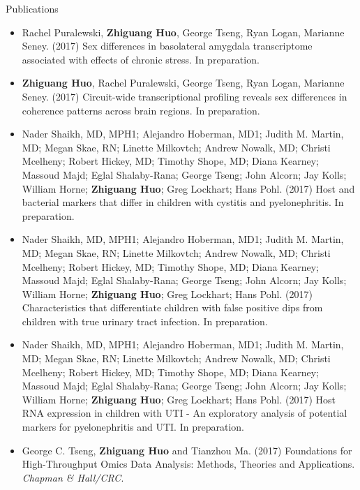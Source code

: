 \documentclass{resume} %
\begin{document}
\begin{rSection}{Publications}
\begin{itemize}
\item Rachel Puralewski, {\bf Zhiguang Huo}, George Tseng, Ryan Logan, Marianne Seney. (2017) Sex differences in basolateral amygdala transcriptome associated with effects of chronic stress. In preparation.

\item {\bf Zhiguang Huo}, Rachel Puralewski, George Tseng, Ryan Logan, Marianne Seney. (2017) Circuit-wide transcriptional profiling reveals sex differences in coherence patterns across brain regions. In preparation.

\item Nader Shaikh, MD, MPH1; Alejandro Hoberman, MD1; Judith M. Martin, MD; Megan Skae, RN; Linette Milkovtch; Andrew Nowalk, MD; Christi Mcelheny; Robert Hickey, MD; Timothy Shope, MD; Diana Kearney; Massoud Majd; Eglal Shalaby-Rana; George Tseng; John Alcorn; Jay Kolls; William Horne; {\bf Zhiguang Huo}; Greg Lockhart; Hans Pohl. (2017) Host and bacterial markers that differ in children with cystitis and pyelonephritis. In preparation.

\item Nader Shaikh, MD, MPH1; Alejandro Hoberman, MD1; Judith M. Martin, MD; Megan Skae, RN; Linette Milkovtch; Andrew Nowalk, MD; Christi Mcelheny; Robert Hickey, MD; Timothy Shope, MD; Diana Kearney; Massoud Majd; Eglal Shalaby-Rana; George Tseng; John Alcorn; Jay Kolls; William Horne; {\bf Zhiguang Huo}; Greg Lockhart; Hans Pohl. (2017) Characteristics that differentiate children with false positive dips from children with true urinary tract infection. In preparation.

\item Nader Shaikh, MD, MPH1; Alejandro Hoberman, MD1; Judith M. Martin, MD; Megan Skae, RN; Linette Milkovtch; Andrew Nowalk, MD; Christi Mcelheny; Robert Hickey, MD; Timothy Shope, MD; Diana Kearney; Massoud Majd; Eglal Shalaby-Rana; George Tseng; John Alcorn; Jay Kolls; William Horne; {\bf Zhiguang Huo}; Greg Lockhart; Hans Pohl. (2017) Host RNA expression in children with UTI - An exploratory analysis of potential markers for pyelonephritis and UTI. In preparation.

\item  George C. Tseng, {\bf Zhiguang Huo} and Tianzhou Ma. (2017)
Foundations for High-Throughput Omics Data Analysis: Methods, Theories and Applications. \emph{Chapman \& Hall/CRC}. 

\end{itemize}

\end{rSection}
\end{document}
